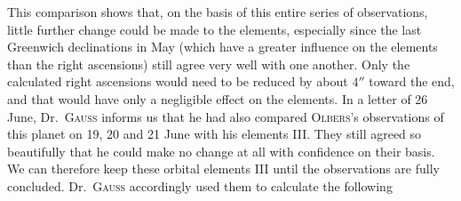 This comparison shows that, on the basis of this entire series of observations, little further change could be made to the elements, especially since the last Greenwich declinations in May (which have a greater influence on the elements than the right ascensions) still agree very well with one another. Only the calculated right ascensions would need to be reduced by about $4''$ toward the end, and that would have only a negligible effect on the elements. In a letter of 26 June, Dr.\ \textsc{Gauss} informs us that he had also compared \textsc{Olbers}’s observations of this planet on 19, 20 and 21 June with his elements III. They still agreed so beautifully that he could make no change at all with confidence on their basis. We can therefore keep these orbital elements III until the observations are fully concluded. Dr.\ \textsc{Gauss} accordingly used them to calculate the following
